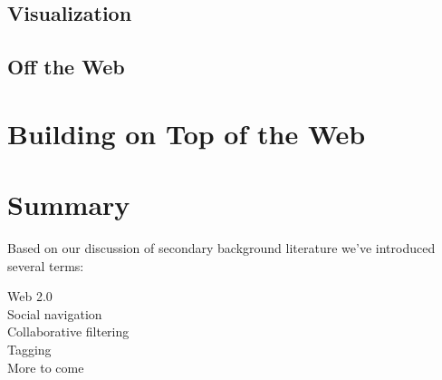 \subsection{Visualization}

\subsection{Off the Web}

\section{Building on Top of the Web}

\section{Summary}

Based on our discussion of secondary background literature we've introduced
several terms:

\begin{description}
  \item[Web 2.0]
  \item[Social navigation]
  \item[Collaborative filtering]
  \item[Tagging]
  \item[More to come]
\end{description}
